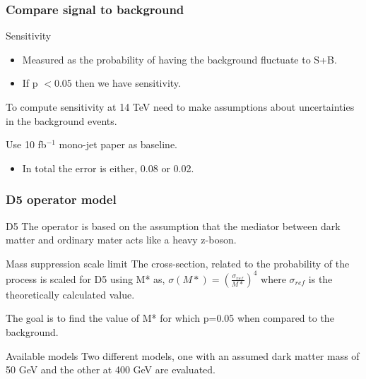 \documentclass[handout]{beamer}
\begin{document}
\begin{frame}[shrink=10]\frametitle{Compare signal to background}
\begin{block}{Sensitivity}
\begin{itemize}
\item Measured as the probability of having the background fluctuate to S+B.
\item If p $<0.05$ then we have sensitivity.
\end{itemize}
\end{block}
\begin{block}{}
To compute sensitivity at 14 TeV need to make assumptions about uncertainties in the background events.

Use 10 fb$^{-1}$ mono-jet paper as baseline.  
\begin{itemize}
\item In total the error is either, 0.08 or 0.02.
\end{itemize}  
\end{block}
\end{frame}



\begin{frame}[shrink=10]\frametitle{D5 operator model}
\begin{block}{D5}
The operator is based on the assumption that the mediator between dark matter and ordinary mater acts like a heavy z-boson.
\end{block}
\begin{block}{Mass suppression scale limit}
The cross-section, related to the probability of the process is scaled for D5 using M* as, $\sigma (M*) = (\frac{\sigma_{ref}}{M*})^4$ where $\sigma_{ref}$ is the theoretically calculated value.

The goal is to find the value of M* for which p=0.05 when compared to the background.
\end{block}
\begin{block}{Available models}
Two different models, one with an assumed dark matter mass of 50 GeV and the other at 400 GeV are evaluated.
\end{block}
\end{frame}
\end{document}
